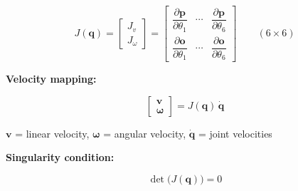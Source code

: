 \documentclass[border=10pt]{standalone}
\begin{document}
\[
J(\mathbf{q}) = 
\begin{bmatrix}
J_v \\ J_\omega
\end{bmatrix}
=
\begin{bmatrix}
\dfrac{\partial \mathbf{p}}{\partial \theta_1} & \cdots & \dfrac{\partial \mathbf{p}}{\partial \theta_6} \\[6pt]
\dfrac{\partial \mathbf{o}}{\partial \theta_1} & \cdots & \dfrac{\partial \mathbf{o}}{\partial \theta_6}
\end{bmatrix}
\qquad (6 \times 6)
\]

\bigskip

\textbf{Velocity mapping:}

\[
\begin{bmatrix} \mathbf{v} \\ \boldsymbol{\omega} \end{bmatrix}
= J(\mathbf{q})\,\dot{\mathbf{q}}
\]

\qquad\qquad

$\mathbf{v}$ = linear velocity, $\boldsymbol{\omega}$ = angular velocity, $\dot{\mathbf{q}}$ = joint velocities

\bigskip

\textbf{Singularity condition:}

\[
\det\!\bigl(J(\mathbf{q})\bigr) = 0
\]
\end{document}
